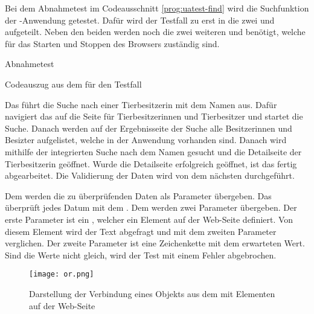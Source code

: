 Bei dem  Abnahmetest im Codeausschnitt \ref{prog:uatest-find} wird die Suchfunktion der -Anwendung getestet. Dafür wird der Testfall zu erst in die zwei   und  aufgeteilt. Neben den beiden  werden noch die zwei weiteren   und   benötigt, welche für das Starten und Stoppen des Browsers zuständig sind. 

\begin{program}

\caption{Abnahmetest }
\label{prog:uatest-find}
\end{program}


\begin{program}

\caption{Codeauszug aus dem  für den Testfall }
\label{prog:or-find}
\end{program}

\SuperPar
Das   führt die Suche nach einer Tierbesitzerin mit dem Namen  aus. Dafür navigiert das  auf die Seite für Tierbesitzerinnen und Tierbesitzer und startet die Suche. Danach werden auf der Ergebnisseite der Suche alle Besitzerinnen und Besizter aufgelistet, welche in der Anwendung vorhanden sind. Danach wird mithilfe der integrierten Suche nach dem Namen  gesucht und die Detailseite der Tierbesitzerin geöffnet. Wurde die Detailseite erfolgreich geöffnet, ist das  fertig abgearbeitet. Die Validierung der Daten wird von dem nächsten   durchgeführt.

\SuperPar
Dem   werden die zu überprüfenden Daten als Parameter übergeben. Das  überprüft jedes Datum mit dem  . Dem  werden zwei Parameter übergeben. Der erste Parameter ist ein , welcher ein Element auf der Web-Seite definiert. Von diesem Element wird der Text abgefragt und mit dem zweiten Parameter verglichen. Der zweite Parameter ist eine Zeichenkette mit dem erwarteten Wert. Sind die Werte nicht gleich, wird der Test mit einem Fehler abgebrochen. 

\begin{figure}
\centering
\texttt{[image: or.png]}
\caption{Darstellung der Verbindung eines Objekts aus dem  mit Elementen auf der Web-Seite}
\label{fig:orwebsite}
\end{figure}


